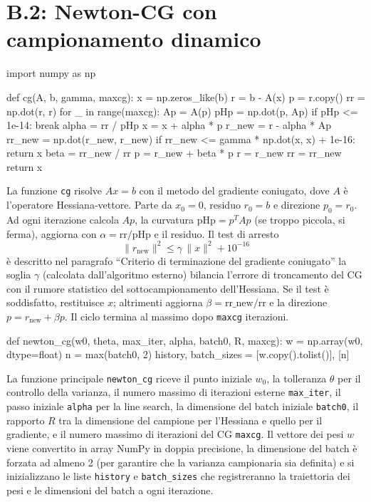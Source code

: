 \documentclass[italian, a4paper, twoside, binding=6mm]{sapthesis}
\begin{document}
\section{B.2: Newton-CG con campionamento dinamico}
\begin{pythoncode}[title= Newton-CG]

import numpy as np

def cg(A, b, gamma, maxcg):
    x = np.zeros_like(b)
    r = b - A(x)
    p = r.copy()
    rr = np.dot(r, r)
    for _ in range(maxcg):
        Ap = A(p)
        pHp = np.dot(p, Ap)
        if pHp <= 1e-14:
            break
        alpha = rr / pHp
        x = x + alpha * p
        r_new = r - alpha * Ap
        rr_new = np.dot(r_new, r_new)
        if rr_new <= gamma * np.dot(x, x) + 1e-16:
            return x
        beta = rr_new / rr
        p = r_new + beta * p
        r = r_new
        rr = rr_new
    return x
\end{pythoncode}
La funzione \texttt{cg} risolve \(A x = b\) con il metodo del gradiente coniugato, dove \(A\) è l'operatore Hessiana-vettore. Parte da \(x_0=0\), residuo \(r_0=b\) e direzione \(p_0=r_0\). Ad ogni iterazione calcola \(Ap\), la curvatura \(\text{pHp}=p^T A p\) (se troppo piccola, si ferma), aggiorna con \(\alpha=\text{rr}/\text{pHp}\) e il residuo. Il test di arresto
\[
\|r_{\text{new}}\|^2 \le \gamma\,\|x\|^2 + 10^{-16}
\]
è descritto nel paragrafo ``Criterio di terminazione del gradiente coniugato'' la soglia \(\gamma\) (calcolata dall'algoritmo esterno) bilancia l'errore di troncamento del CG con il rumore statistico del sottocampionamento dell'Hessiana. Se il test è soddisfatto, restituisce \(x\); altrimenti aggiorna \(\beta = \text{rr\_new}/\text{rr}\) e la direzione \(p = r_{\text{new}} + \beta p\). Il ciclo termina al massimo dopo \texttt{maxcg} iterazioni.
\begin{pythoncode}[title= Newton-CG]

def newton_cg(w0, theta, max_iter, alpha, batch0, R, maxcg):
    w = np.array(w0, dtype=float)
    n = max(batch0, 2)
    history, batch_sizes = [w.copy().tolist()], [n]
\end{pythoncode}
La funzione principale \texttt{newton\_cg} riceve il punto iniziale \(w_0\), la tolleranza \(\theta\) per il controllo della varianza, il numero massimo di iterazioni esterne \texttt{max\_iter}, il passo iniziale \texttt{alpha} per la line search, la dimensione del batch iniziale \texttt{batch0}, il rapporto \(R\) tra la dimensione del campione per l'Hessiana e quello per il gradiente, e il numero massimo di iterazioni del CG \texttt{maxcg}. Il vettore dei pesi \(w\) viene convertito in array NumPy in doppia precisione, la dimensione del batch è forzata ad almeno 2 (per garantire che la varianza campionaria sia definita) e si inizializzano le liste \texttt{history} e \texttt{batch\_sizes} che registreranno la traiettoria dei pesi e le dimensioni del batch a ogni iterazione.
\end{document}
